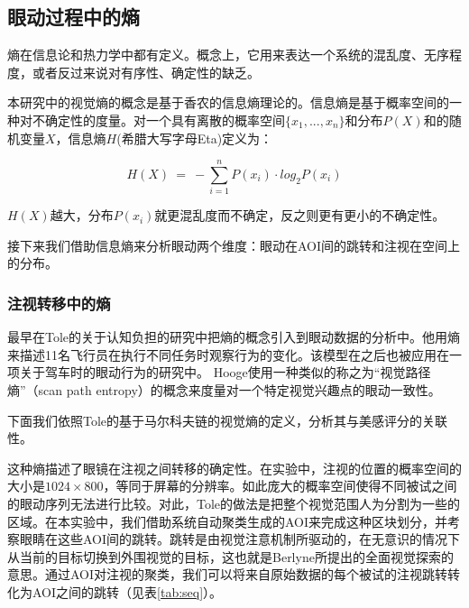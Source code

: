 \subsection{眼动过程中的熵}
熵在信息论和热力学中都有定义。概念上，它用来表达一个系统的混乱度、无序程度，或者反过来说对有序性、确定性的缺乏。

本研究中的视觉熵的概念是基于香农的信息熵理论的。信息熵是基于概率空间的一种对不确定性的度量。对一个具有离散的概率空间$\{x_1, ..., x_n\}$和分布$P(X)$和的随机变量$X$，信息熵$H$(希腊大写字母Eta)定义为：

$$H(X)~=~-\sum_{i=1}^n P(x_i)\cdot log_{2}P(x_i)$$

$H(X)$越大，分布$P(x_i)$就更混乱度而不确定，反之则更有更小的不确定性。

接下来我们借助信息熵来分析眼动两个维度：眼动在AOI间的跳转和注视在空间上的分布。

\subsubsection{注视转移中的熵}
最早在Tole的关于认知负担的研究中把熵的概念引入到眼动数据的分析中。他用熵来描述11名飞行员在执行不同任务时观察行为的变化。该模型在之后也被应用在一项关于驾车时的眼动行为的研究中。
Hooge使用一种类似的称之为“视觉路径熵”（scan path entropy）的概念来度量对一个特定视觉兴趣点的眼动一致性。

下面我们依照Tole的基于马尔科夫链的视觉熵的定义，分析其与美感评分的关联性。

这种熵描述了眼镜在注视之间转移的确定性。在实验中，注视的位置的概率空间的大小是$1024\times800$，等同于屏幕的分辨率。如此庞大的概率空间使得不同被试之间的眼动序列无法进行比较。对此，Tole的做法是把整个视觉范围人为分割为一些的区域。在本实验中，我们借助系统自动聚类生成的AOI来完成这种区块划分，并考察眼睛在这些AOI间的跳转。跳转是由视觉注意机制所驱动的，在无意识的情况下从当前的目标切换到外围视觉的目标，这也就是Berlyne所提出的全面视觉探索的意思。通过AOI对注视的聚类，我们可以将来自原始数据的每个被试的注视跳转转化为AOI之间的跳转（见表\ref{tab:seq}）。

